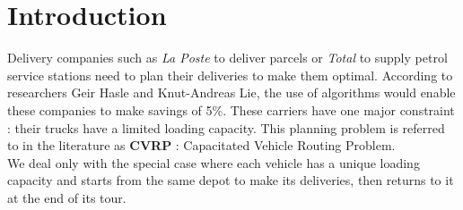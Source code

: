 \chapter*{Introduction}

Delivery companies such as \textit{La Poste} to deliver parcels or \textit{Total} to supply petrol service stations need to plan their deliveries to make them optimal. According to researchers {\sc Geir Hasle} and {\sc Knut-Andreas Lie}, the use of algorithms would enable these companies to make savings of 5\%. These carriers have one major constraint : their trucks have a limited loading capacity. This planning problem is referred to in the literature as \textbf{CVRP} : Capacitated Vehicle Routing Problem. \\
We deal only with the special case where each vehicle has a unique loading capacity and starts from the same depot to make its deliveries, then returns to it at the end of its tour.
